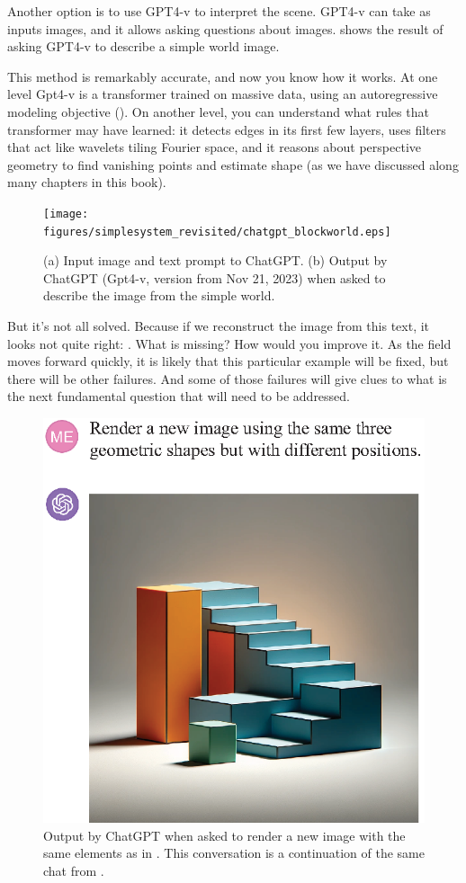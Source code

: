 Another option is to use GPT4-v \cite{openai2023gpt4v} to interpret the scene. GPT4-v can take as inputs images, and it allows asking questions about images. \Fig{\ref{fig:chatgpt_blockworld}} shows the result of asking GPT4-v to describe a simple world image. 

This method is remarkably accurate, and now you know how it works. At one level Gpt4-v is a transformer trained on massive data, using an autoregressive modeling objective (\chap{\ref{chapter:transformers}}). On another level, you can understand what rules that transformer may have learned: it detects edges in its first few layers, uses filters that act like wavelets tiling Fourier space, and it reasons about perspective geometry to find vanishing points and estimate shape (as we have discussed along many chapters in this book).



\begin{figure}
\centerline{
\texttt{[image: figures/simplesystem\_revisited/chatgpt\_blockworld.eps]}
} 
\caption{(a) Input image and text prompt to ChatGPT. (b) Output by ChatGPT (Gpt4-v, version from Nov 21, 2023) when asked to describe the image from the simple world.} 
\label{fig:chatgpt_blockworld}
\end{figure}

But it's not all solved. Because if we reconstruct the image from this text, it looks not quite right: \fig{\ref{fig:chatgpt_blockworld2}}. What is missing? How would you improve it. As the field moves forward quickly, it is likely that this particular example will be fixed, but there will be other failures. And some of those failures will give clues to what is the next fundamental question that will need to be addressed.

\begin{figure}
\centerline{
\includegraphics[width=.5\linewidth]{figures/simplesystem_revisited/chatgpt_blockworld_2.eps}
} 
\caption{Output by ChatGPT when asked to render a new image with the same elements as in \fig{\ref{fig:chatgpt_blockworld}}. This conversation is a continuation of the same chat from \fig{\ref{fig:chatgpt_blockworld}}.} 
\label{fig:chatgpt_blockworld2}
\end{figure}

